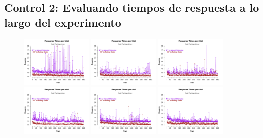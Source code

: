 \subsection{Control 2: Evaluando tiempos de respuesta a lo largo del experimento}


\begin{figure}[th]
\centering
\includegraphics[width=0.30\textwidth]{Figures/RTs_Exp2_P1} \includegraphics[width=0.30\textwidth]{Figures/RTs_Exp2_P2} \includegraphics[width=0.30\textwidth]{Figures/RTs_Exp2_P3}
\includegraphics[width=0.30\textwidth]{Figures/RTs_Exp2_P4} \includegraphics[width=0.30\textwidth]{Figures/RTs_Exp2_P5} \includegraphics[width=0.30\textwidth]{Figures/RTs_Exp2_P6}

\end{figure}
